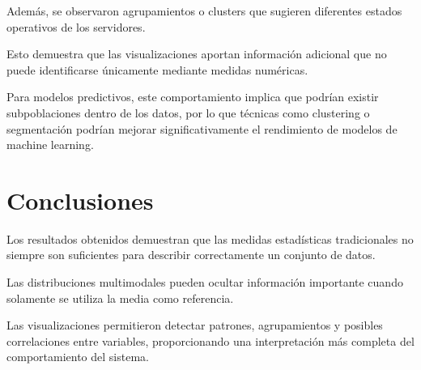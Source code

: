 \documentclass[12pt]{article}
\begin{document}
Además, se observaron agrupamientos o clusters que sugieren diferentes estados
operativos de los servidores.

Esto demuestra que las visualizaciones aportan información adicional que no
puede identificarse únicamente mediante medidas numéricas.

Para modelos predictivos, este comportamiento implica que podrían existir
subpoblaciones dentro de los datos, por lo que técnicas como clustering o
segmentación podrían mejorar significativamente el rendimiento de modelos de
machine learning.
\section{Conclusiones}

Los resultados obtenidos demuestran que las medidas estadísticas tradicionales
no siempre son suficientes para describir correctamente un conjunto de datos.

Las distribuciones multimodales pueden ocultar información importante cuando
solamente se utiliza la media como referencia.

Las visualizaciones permitieron detectar patrones, agrupamientos y posibles
correlaciones entre variables, proporcionando una interpretación más completa
del comportamiento del sistema.
\end{document}

